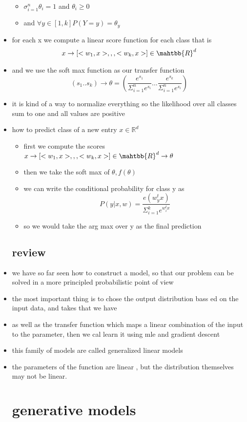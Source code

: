 \documentclass{article}
\begin{document}
\begin{itemize}
\begin{itemize}
\item $\sigma_{i=1}^{n}\theta_i=1$ and $\theta_i\geq 0$
\item and $\forall y\in [1,k] P(Y=y)=\theta_y$
\end{itemize}
\item for each x we compute a linear score function for each class that is $$x\rightarrow [<w_1,x>,,,<w_k,x>]\in \mahtbb{R}^d$$
\item and we use the soft max function as our transfer function 
$$(s_1..s_k)\rightarrow \theta = (\frac{e^{s_1}}{\Sigma_{i=1}^{n}e^{s_i}}...\frac{e^{s_k}}{\Sigma_{i=1}^{n}e^{s_i}})$$
\item it is kind of a way to normalize everything so the likelihood over all classes sum to one and all values are positive

\item how to predict class of a new entry $x\in\mathbb{R}^d$
\begin{itemize}
    \item first we compute the scores $x\rightarrow [<w_1,x>,,,<w_k,x>]\in \mahtbb{R}^d\rightarrow \theta$
    \item then we take the soft max of $\theta, f(\theta)$
    \item we can write the conditional probability for class y as $$P(y|x,w)=\frac{e(w^t_yx)}{\Sigma_{i=1}^{k}e^{w_i^tx}}$$
    \item so we would take the arg max over y as the final prediction 
\end{itemize}
\subsection{review}
\item we have so far seen how to construct a model, so that our problem can be solved in a more principled probabilistic point of view
\item the most important thing is to chose the output distribution bass ed on the input data, and takes that we have 
\item as well as the transfer function which maps a linear combination of the input to the parameter, then we cal learn it using mle and gradient descent 
\item this family of models are called generalized linear models 
\item the parameters of the function are linear , but the distribution themselves may not be linear. 
\section{generative models}

\end{itemize}
\end{document}
